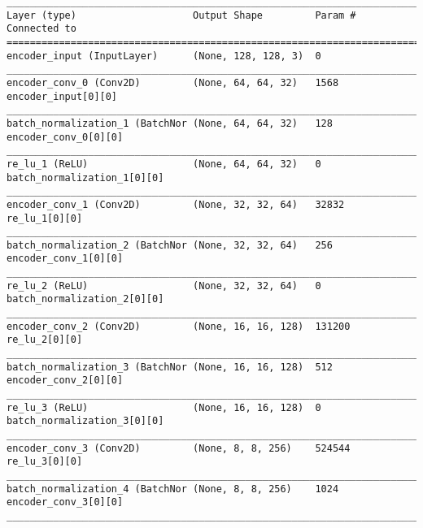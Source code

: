 \begin{lstlisting}[caption={CelebA-VAE Encoder},captionpos=b,basicstyle=\tiny, label={lst:mnist-vae-encoder}]
__________________________________________________________________________________________________
Layer (type)                    Output Shape         Param #     Connected to
==================================================================================================
encoder_input (InputLayer)      (None, 128, 128, 3)  0
__________________________________________________________________________________________________
encoder_conv_0 (Conv2D)         (None, 64, 64, 32)   1568        encoder_input[0][0]
__________________________________________________________________________________________________
batch_normalization_1 (BatchNor (None, 64, 64, 32)   128         encoder_conv_0[0][0]
__________________________________________________________________________________________________
re_lu_1 (ReLU)                  (None, 64, 64, 32)   0           batch_normalization_1[0][0]
__________________________________________________________________________________________________
encoder_conv_1 (Conv2D)         (None, 32, 32, 64)   32832       re_lu_1[0][0]
__________________________________________________________________________________________________
batch_normalization_2 (BatchNor (None, 32, 32, 64)   256         encoder_conv_1[0][0]
__________________________________________________________________________________________________
re_lu_2 (ReLU)                  (None, 32, 32, 64)   0           batch_normalization_2[0][0]
__________________________________________________________________________________________________
encoder_conv_2 (Conv2D)         (None, 16, 16, 128)  131200      re_lu_2[0][0]
__________________________________________________________________________________________________
batch_normalization_3 (BatchNor (None, 16, 16, 128)  512         encoder_conv_2[0][0]
__________________________________________________________________________________________________
re_lu_3 (ReLU)                  (None, 16, 16, 128)  0           batch_normalization_3[0][0]
__________________________________________________________________________________________________
encoder_conv_3 (Conv2D)         (None, 8, 8, 256)    524544      re_lu_3[0][0]
__________________________________________________________________________________________________
batch_normalization_4 (BatchNor (None, 8, 8, 256)    1024        encoder_conv_3[0][0]
__________________________________________________________________________________________________

\end{lstlisting}
